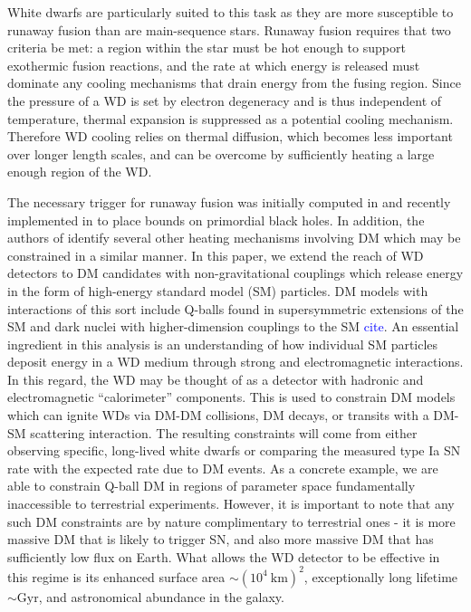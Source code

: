 \documentclass[twocolumn,showpacs,preprintnumbers,amsmath,amssymb,prd]{revtex4}
\begin{document}
White dwarfs are particularly suited to this task as they are more susceptible to runaway fusion than are main-sequence stars.
Runaway fusion requires that two criteria be met: a region within the star must be hot enough to support exothermic fusion reactions, and the rate at which energy is released must dominate any cooling mechanisms that drain energy from the fusing region.
Since the pressure of a WD is set by electron degeneracy and is thus independent of temperature, thermal expansion is suppressed as a potential cooling mechanism.
Therefore WD cooling relies on thermal diffusion, which becomes less important over longer length scales, and can be overcome by sufficiently heating a large enough region of the WD.

The necessary trigger for runaway fusion was initially computed in \cite{Woosley} and recently implemented in \cite{Graham:2015apa} to place bounds on primordial black holes. 
In addition, the authors of \cite{Graham:2015apa} identify several other heating mechanisms involving DM which may be constrained in a similar manner.
In this paper, we extend the reach of WD detectors to DM candidates with non-gravitational couplings which release energy in the form of high-energy standard model (SM) particles.
DM models with interactions of this sort include Q-balls found in supersymmetric extensions of the SM and dark nuclei with higher-dimension couplings to the SM \textcolor{blue}{cite}.
An essential ingredient in this analysis is an understanding of how individual SM particles deposit energy in a WD medium through strong and electromagnetic interactions. 
In this regard, the WD may be thought of as a detector with hadronic and electromagnetic ``calorimeter'' components.
This is used to constrain DM models which can ignite WDs via DM-DM collisions, DM decays, or transits with a DM-SM scattering interaction. 
The resulting constraints will come from either observing specific, long-lived white dwarfs or comparing the measured type Ia SN rate with the expected rate due to DM events.
As a concrete example, we are able to constrain Q-ball DM in regions of parameter space fundamentally inaccessible to terrestrial experiments.
However, it is important to note that any such DM constraints are by nature complimentary to terrestrial ones - it is more massive DM that is likely to trigger SN, and also more massive DM that has sufficiently low flux on Earth.
What allows the WD detector to be effective in this regime is its enhanced surface area $\sim (10^4 ~\text{km})^2$, exceptionally long lifetime $\sim \text{Gyr}$, and astronomical abundance in the galaxy. 
\end{document}
